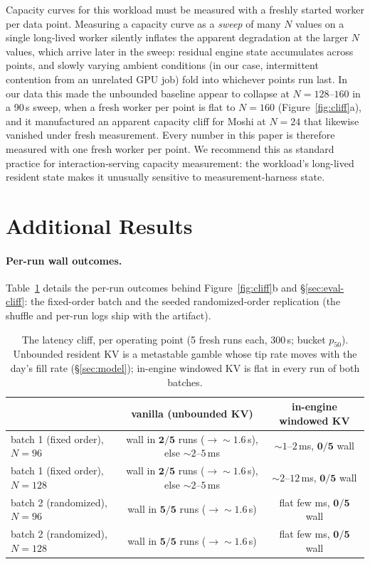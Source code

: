 Capacity curves for this workload must be measured with a freshly started worker per data point.
Measuring a capacity curve as a \emph{sweep} of many $N$ values on a single long-lived worker silently
inflates the apparent degradation at the larger $N$ values, which arrive later in the sweep: residual
engine state accumulates across points, and slowly varying ambient conditions (in our case, intermittent
contention from an unrelated GPU job) fold into whichever points run last. In our data this made the
unbounded baseline appear to collapse at $N{=}128$--$160$ in a 90\,s sweep, when a fresh worker per point
is flat to $N{=}160$ (Figure~\ref{fig:cliff}a), and it manufactured an apparent capacity cliff for Moshi
at $N{=}24$ that likewise vanished under fresh measurement. Every number in this paper is therefore
measured with one fresh worker per point. We recommend this as standard practice for interaction-serving
capacity measurement: the workload's long-lived resident state makes it unusually sensitive to
measurement-harness state.

\section{Additional Results}
\label{app:results}

\paragraph{Per-run wall outcomes.} Table~\ref{tab:wall} details the per-run outcomes behind
Figure~\ref{fig:cliff}b and \S\ref{sec:eval-cliff}: the fixed-order batch and the seeded
randomized-order replication (the shuffle and per-run logs ship with the artifact).

\begin{table}[h]
\centering\small
\caption{The latency cliff, per operating point (5 fresh runs each, 300\,s; bucket $p_{50}$). Unbounded
resident KV is a metastable gamble whose tip rate moves with the day's fill rate (\S\ref{sec:model});
in-engine windowed KV is flat in every run of both batches.}
\label{tab:wall}
\setlength{\tabcolsep}{4pt}
\begin{tabular}{lcc}
\toprule
& vanilla (unbounded KV) & in-engine windowed KV \\
\midrule
batch 1 (fixed order), $N{=}96$  & wall in $\mathbf{2/5}$ runs ($\rightarrow{\sim}1.6$\,s), else ${\sim}2$--$5$\,ms & ${\sim}1$--$2$\,ms, $\mathbf{0/5}$ wall \\
batch 1 (fixed order), $N{=}128$ & wall in $\mathbf{2/5}$ runs ($\rightarrow{\sim}1.6$\,s), else ${\sim}2$--$5$\,ms & ${\sim}2$--$12$\,ms, $\mathbf{0/5}$ wall \\
batch 2 (randomized), $N{=}96$   & wall in $\mathbf{5/5}$ runs ($\rightarrow{\sim}1.6$\,s) & flat few ms, $\mathbf{0/5}$ wall \\
batch 2 (randomized), $N{=}128$  & wall in $\mathbf{5/5}$ runs ($\rightarrow{\sim}1.6$\,s) & flat few ms, $\mathbf{0/5}$ wall \\
\bottomrule
\end{tabular}
\end{table}

